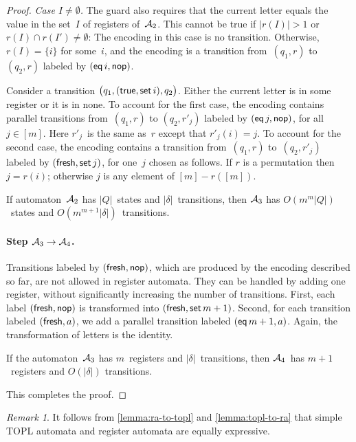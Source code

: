 \documentclass{article} %
\theoremstyle{definition}
\theoremstyle{remark}
\newtheorem{remark}{Remark}
\begin{document}
\begin{proof}
\emph{Case $I\ne\emptyset$.}\quad
The guard also requires that the current letter equals the value in the set~$I$ of registers of~${\cal A}_2$.
This cannot be true if $|r(I)|>1$ or $r(I)\cap r(I')\ne\emptyset$: The encoding in this case is no transition.
Otherwise, $r(I)=\{i\}$ for some~$i$, and the encoding is a transition from~$(q_1,r)$ to~$(q_2,r)$ labeled by $({\sf eq}\,i,{\sf nop})$.

\smallskip
Consider a transition $\bigl(q_1,({\sf true},{\sf set}\,i),q_2\bigr)$.
Either the current letter is in some register or it is in none.
To account for the first case, the encoding contains parallel transitions from~$(q_1,r)$ to $(q_2,r'_j)$ labeled by $({\sf eq}\,j,{\sf nop})$, for all $j\in[m]$.
Here $r'_j$~is the same as~$r$ except that $r'_j(i)=j$.
To account for the second case, the encoding contains a transition from~$(q_1,r)$ to~$(q_2,r'_j)$ labeled by $({\sf fresh},{\sf set}\,j)$, for one~$j$ chosen as follows.
If $r$ is a permutation then $j=r(i)$; otherwise $j$ is any element of $[m]-r([m])$.

\smallskip
If automaton~${\cal A}_2$ has $|Q|$~states and $|\delta|$~transitions, then ${\cal A}_3$ has $O(m^m|Q|)$~states and $O(m^{m+1}|\delta|)$~transitions.

\paragraph{Step ${\cal A}_3\to{\cal A}_4$.}
Transitions labeled by $({\sf fresh},{\sf nop})$, which are produced by the encoding described so far, are not allowed in register automata.
They can be handled by adding one register, without significantly increasing the number of transitions.
First, each label $({\sf fresh},{\sf nop})$ is transformed into $({\sf fresh},{\sf set}\,m+1)$.
Second, for each transition labeled $({\sf fresh},a)$, we add a parallel transition labeled $({\sf eq}\,m+1,a)$.
Again, the transformation of letters is the identity.

If the automaton~${\cal A}_3$ has $m$~registers and $|\delta|$~transitions, then ${\cal A}_4$~has $m+1$~registers and $O(|\delta|)$ transitions.

\smallskip
This completes the proof.
\end{proof}

\begin{remark}
It follows from \autoref{lemma:ra-to-topl} and \autoref{lemma:topl-to-ra} that simple TOPL automata and register automata are equally expressive.
\end{remark}
\end{document}
